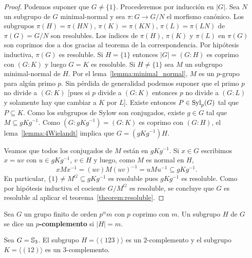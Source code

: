 
\begin{proof}
	Podemos suponer que $G\ne\{1\}$. Procederemos por inducción en $|G|$. Sea $N$
	un subgrupo de $G$ minimal-normal y sea $\pi\colon G\to G/N$ el morfismo
	canónico.  Los subgrupos $\pi(H)=\pi(HN)$, $\pi(K)=\pi(KN)$, $\pi(L)=\pi(LN)$ de $\pi(G)=G/N$ son
	resolubles. Los índices de $\pi(H)$, $\pi(K)$ y $\pi(L)$ en $\pi(G)$ son
	coprimos dos a dos gracias al teorema de la correspondencia. 
    Por hipótesis inductiva, $\pi(G)$ es resoluble. Si $H=\{1\}$
	entonces $|G|=(G:H)$ es coprimo con $(G:K)$ y luego $G=K$ es resoluble. Si
	$H\ne \{1\}$ sea $M$ un subgrupo minimal-normal de $H$. Por el
	lema~\ref{lemma:minimal_normal}, $M$ es un $p$-grupo para algún primo $p$.
	Sin pérdida de generalidad podemos suponer que el primo $p$ no divide a
	$(G:K)$ [pues si $p$ divide a $(G:K)$ entonces $p$ no divide a $(G:L)$ y solamente hay que cambiar a $K$ por $L$]. 
	Existe entonces $P\in\mathrm{Syl}_p(G)$ tal que $P\subseteq K$. Como los
	subgrupos de Sylow son conjugados, existe $g\in G$ tal que $M\subseteq
	gKg^{-1}$. Como $(G:gKg^{-1})=(G:K)$ es coprimo con $(G:H)$, el
	lema~\ref{lemma:4Wielandt} implica que $G=(gKg^{-1})H$. 
	
	Veamos que todos los conjugados de $M$ están en $gKg^{-1}$. 
	Si $x\in G$ escribimos $x=uv$ con $u\in 
	gKg^{-1}$, $v\in H$ y luego, como $M$ es normal en $H$, 
	\[
	xMx^{-1}=(uv)M(uv)^{-1}=uMu^{-1}\subseteq gKg^{-1}.
	\]
	En particular, $\{1\}\ne M^G\subseteq gKg^{-1}$ es resoluble pues $gKg^{-1}$ es
	resoluble. Como por hipótesis inductiva el cociente $G/M^G$ es resoluble, se concluye
	que $G$ es resoluble al aplicar el teorema~\ref{theorem:resoluble}.
\end{proof}

\begin{definition}
	Sea $G$ un grupo finito de orden $p^{\alpha}m$ con $p$ coprimo con $m$. Un
	subgrupo $H$ de $G$ se dice un \textbf{$p$-complemento} si $|H|=m$. 
\end{definition}

\begin{example}
	Sea $G=\mathbb{S}_3$. El subgrupo $H=\langle (123)\rangle$ es un $2$-complemento
	y el subgrupo $K=\langle (12)\rangle$ es un $3$-complemento.
\end{example}

